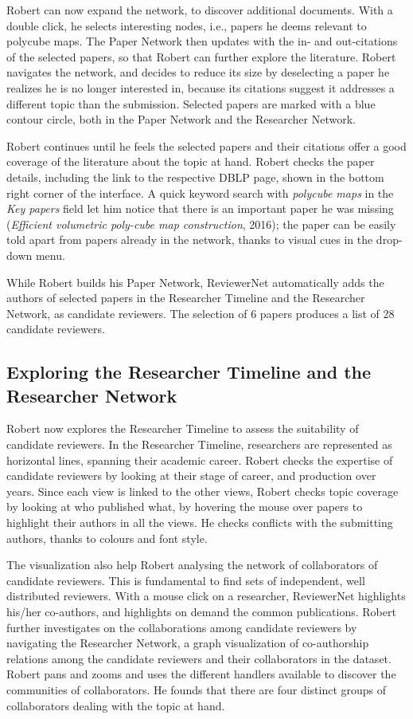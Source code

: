 Robert can now expand the network, to discover additional documents. With a double click, he selects interesting nodes, i.e., papers he deems relevant to polycube maps. The Paper Network then updates with the in- and out-citations of the selected papers, so that Robert can further explore the literature. Robert navigates the network, and decides to reduce its size by deselecting a paper he realizes he is no longer interested in, because its citations suggest it addresses a different topic than the submission. Selected papers are marked with a blue contour circle, both in the Paper Network and the Researcher Network. 

Robert continues until he feels the selected papers and their citations offer a good coverage of the literature about the topic at hand. Robert checks the paper details, including the link to the respective DBLP page, shown in the bottom right corner of the interface. A quick keyword search with \emph{polycube maps} in the \emph{Key papers} field let him notice that there is an important paper he was missing (\emph{Efficient volumetric poly-cube map construction}, 2016); the paper can be easily told apart from papers already in the network, thanks to visual cues in the drop-down menu. 

While Robert builds his Paper Network, ReviewerNet automatically adds the authors of selected papers in the Researcher Timeline and the Researcher Network, as candidate reviewers.  The selection of 6 papers produces a list of 28 candidate reviewers. 


\subsection{Exploring the Researcher Timeline and the Researcher Network} 
 
Robert now explores the Researcher Timeline to assess the suitability of candidate reviewers. In the Researcher Timeline, researchers are represented as horizontal lines, spanning their academic career. Robert checks the expertise of candidate reviewers by looking at their stage of career, and production over years. Since each view is linked to the other views, Robert checks topic coverage by looking at who published what, by hovering the mouse over papers to highlight their authors in all the views. He checks conflicts with the submitting authors, thanks to colours and font style. 

The visualization also help Robert analysing the network of collaborators of candidate reviewers. This is fundamental to find sets of independent, well distributed reviewers. With a mouse click on a researcher, ReviewerNet highlights his/her co-authors, and highlights on demand the common publications. Robert further investigates on the collaborations among candidate reviewers by navigating the Researcher Network, a graph visualization of co-authorship relations among the candidate reviewers and their collaborators in the dataset. Robert pans and zooms and uses the different handlers available to discover the communities of collaborators. He founds that there are four distinct groups of collaborators dealing with the topic at hand.

